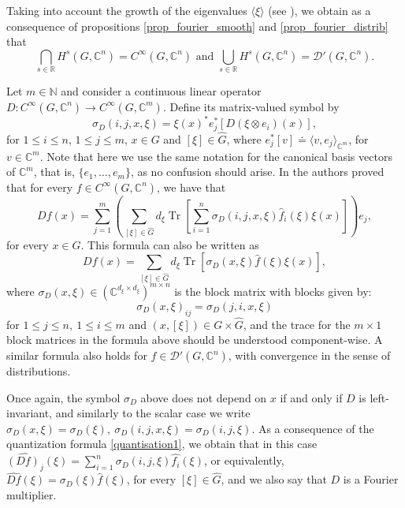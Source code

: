 \documentclass[11pt]{amsart}
\numberwithin{theorem}{section}
\numberwithin{equation}{section}
\theoremstyle{definition}
\numberwithin{example}{section}
\theoremstyle{definition}
\theoremstyle{definition}
\newcommand{\R}{\mathbb{R}}
\newcommand{\N}{\mathbb{N}}
\newcommand{\C}{\mathbb{C}}
\newcommand{\Tr}{\operatorname{Tr}}
\begin{document}
Taking into account the growth of the eigenvalues $\langle\xi\rangle$ (see \cite{Ruz}), we obtain as a consequence of propositions \ref{prop_fourier_smooth} and \ref{prop_fourier_distrib} that
\begin{equation}\label{sobolev-cup-cap}
  \bigcap_{s\in\R} H^s(G,\C^n)=C^\infty(G,\C^n) \text{ and } \bigcup_{s\in\R} H^s(G,\C^n)=\mathcal{D}'(G,\C^n).  
\end{equation}
  
  
  
  
  
  
  
  
  
  
  
  
  Let $m\in \N$ and consider a continuous linear operator $D:C^\infty(G,\C^n)\to C^\infty(G,\C^m)$. Define its matrix-valued symbol by
\begin{equation}\label{symbol}
    \sigma_D(i,j,x,\xi) = \xi(x)^*e_j^*[D(\xi\otimes e_i)(x)],
\end{equation}
for $1\leq i\leq n$, $1\leq j\leq m$, $x\in G$ and $[\xi]\in\widehat{G}$, where $e_j^*[v]\doteq\langle v,e_j\rangle_{\C^m}$, for $v\in\C^m$. Note that here we use the same notation for the canonical basis vectors of $\C^m$, that is,  $\{e_1,\dots,e_m\}$, as no confusion should arise. In \cite{HomoVector} the authors proved that for every $f\in C^\infty(G,\C^n)$, we have that
\begin{equation}\label{quantisation1}
    Df(x) = \sum_{j=1}^m\left(\sum_{[\xi]\in\widehat{G}}d_\xi\Tr\left[\sum_{i=1}^n\sigma_D(i,j,x,\xi)\widehat{f}_i(\xi)\xi(x)\right]\right)e_j,
\end{equation}
 for every $x\in G$. 
 This formula can also be written as 
\begin{equation*}
    Df(x) = \sum_{[\xi]\in\widehat{G}}d_\xi\Tr[\sigma_D(x,\xi)\widehat{f}(\xi)\xi(x)],
\end{equation*}
where $\sigma_D(x,\xi)\in (\mathbb{C}^{d_\xi\times d_\xi})^{m\times n}$ is the block matrix with blocks given by: 
\begin{equation*}
    \sigma_D(x,\xi)_{ij}=\sigma_D(j,i,x,\xi)
\end{equation*}
    for $ 1\leq j\leq n,\ 1\leq i\leq m$ and $ (x,[\xi])\in G\times \widehat{G}$, and the trace for the $m\times 1$ block matrices in the formula  above should be understood component-wise. A similar formula also holds for $f\in\mathcal{D}'(G,\C^n)$, with convergence in the sense of distributions.

Once again, the symbol $\sigma_D$ above does not depend on $x$ if and only if $D$ is left-invariant, and similarly to the scalar case we write $\sigma_D(x,\xi)=\sigma_D(\xi),\ \sigma_D(i,j,x,\xi)=\sigma_D(i,j,\xi)$. As a consequence of the quantization formula \eqref{quantisation1}, we obtain that in this case $\widehat{(Df)_j}(\xi)=\sum_{i=1}^n\sigma_D(i,j,\xi)\widehat{f_i}(\xi)$, or equivalently, 
$\widehat{Df}(\xi)=\sigma_D(\xi)\widehat{f}(\xi)$, for every $[\xi]\in\widehat{G}$, and we also say that $D$ is a Fourier multiplier.
\end{document}
